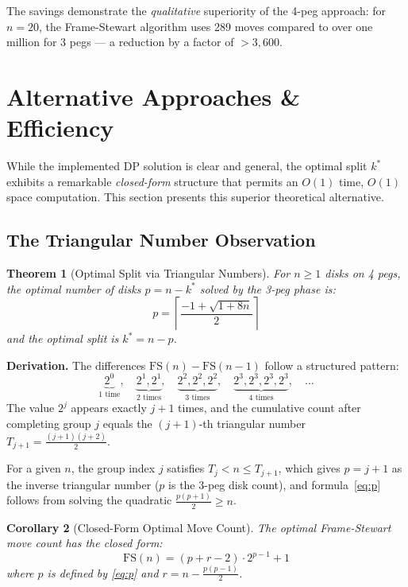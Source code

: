 \documentclass[12pt, a4paper]{article}
\newtheorem{theorem}{Theorem}
\newtheorem{corollary}[theorem]{Corollary}
\begin{document}
The savings demonstrate the \emph{qualitative} superiority of the 4-peg approach: for $n = 20$, the Frame-Stewart algorithm uses 289 moves compared to over one million for 3 pegs — a reduction by a factor of $> 3{,}600$.


\section{Alternative Approaches \& Efficiency}
\label{sec:alternative}

While the implemented DP solution is clear and general, the optimal split $k^*$ exhibits a remarkable \emph{closed-form} structure that permits an $O(1)$ time, $O(1)$ space computation. This section presents this superior theoretical alternative.

\subsection{The Triangular Number Observation}

\begin{theorem}[Optimal Split via Triangular Numbers]
\label{thm:triangular}
For $n \geq 1$ disks on 4 pegs, the optimal number of disks $p = n - k^*$ solved by the 3-peg phase is:
\begin{equation}
\label{eq:p}
p = \left\lceil \frac{-1 + \sqrt{1 + 8n}}{2} \right\rceil
\end{equation}
and the optimal split is $k^* = n - p$.
\end{theorem}

\textbf{Derivation.}
The differences $\text{FS}(n) - \text{FS}(n-1)$ follow a structured pattern:
\[
\underbrace{2^0}_{1\text{ time}},\quad
\underbrace{2^1, 2^1}_{2\text{ times}},\quad
\underbrace{2^2, 2^2, 2^2}_{3\text{ times}},\quad
\underbrace{2^3, 2^3, 2^3, 2^3}_{4\text{ times}},\quad \ldots
\]
The value $2^j$ appears exactly $j + 1$ times, and the cumulative count after completing group $j$ equals the $(j\!+\!1)$-th triangular number $T_{j+1} = \frac{(j+1)(j+2)}{2}$.

For a given $n$, the group index $j$ satisfies $T_j < n \leq T_{j+1}$, which gives $p = j + 1$ as the inverse triangular number ($p$ is the 3-peg disk count), and formula~\eqref{eq:p} follows from solving the quadratic $\frac{p(p+1)}{2} \geq n$.

\begin{corollary}[Closed-Form Optimal Move Count]
\label{cor:closed}
The optimal Frame-Stewart move count has the closed form:
\begin{equation}
\label{eq:closed}
\text{FS}(n) = \left(p + r - 2\right) \cdot 2^{p-1} + 1
\end{equation}
where $p$ is defined by \eqref{eq:p} and $r = n - \frac{p(p-1)}{2}$.
\end{corollary}
\end{document}
